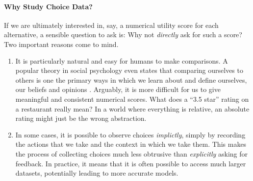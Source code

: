 \paragraph{Why Study Choice Data?}
If we are ultimately interested in, say, a numerical utility score for each alternative, a sensible question to ask is:
Why not \emph{directly} ask for such a score?
Two important reasons come to mind.
\begin{enumerate}
\item It is particularly natural and easy for humans to make comparisons.
A popular theory in social psychology even states that comparing ourselves to others is one the primary ways in which we learn about and define ourselves, our beliefs and opinions \citep{festinger1954theory}.
Arguably, it is more difficult for us to give meaningful and consistent numerical scores.
What does a ``3.5 star'' rating on a restaurant really mean?
In a world where everything is relative, an absolute rating might just be the wrong abstraction.

\item In some cases, it is possible to observe choices \emph{implictly}, simply by recording the actions that we take and the context in which we take them.
This makes the process of collecting choices much less obtrusive than \emph{explicitly} asking for feedback.
In practice, it means that it is often possible to access much larger datasets, potentially leading to more accurate models.
\end{enumerate}


